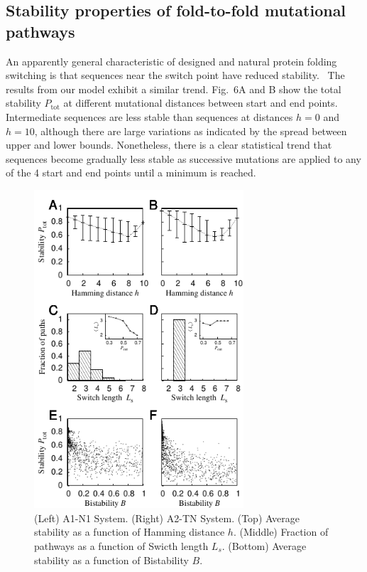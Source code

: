 \documentclass[%
 aip,
rsi,%
 amsmath,amssymb,
 reprint,%
]{revtex4-1}
\newcommand {\Ptot}	{{P_\mathrm{tot}}}
\begin{document}
\subsection{Stability properties of fold-to-fold mutational pathways}
\noindent 
An apparently general characteristic of designed and natural protein folding switching is that sequences near the switch point have reduced stability.~\cite{Bryan2010} The results from our model exhibit a similar trend. Fig.~6A and B show the total stability $\Ptot$ at different mutational distances between start and end points. Intermediate sequences are less stable than sequences at distances $h=0$ and $h=10$, although there are large variations as indicated by the spread between upper and lower bounds. Nonetheless, there is a clear statistical trend that sequences become gradually less stable as successive mutations are applied to any of the 4 start and end points until a minimum is reached. 

\begin{figure}
\includegraphics[width=7.8cm]{Paths}
\caption{(Left) A1-N1 System. (Right) A2-TN System. (Top) Average stability as a function of Hamming distance $h$. (Middle) Fraction of pathways as a function of Swicth length $L_s$. (Bottom) Average stability as a function of Bistability $B$.}
\end{figure}
\end{document}
